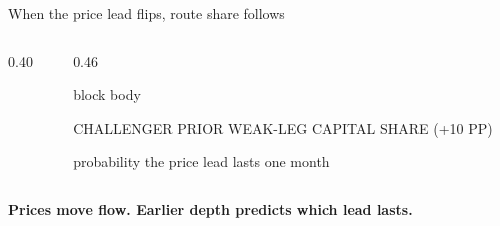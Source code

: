\begin{frame}[label=crossing]{When the price lead flips, route share follows}
\begin{columns}[T,totalwidth=0.91\textwidth]
\begin{column}{0.40\textwidth}
\end{column}
\hfill
\begin{column}{0.46\textwidth}
\begin{beamercolorbox}[rounded=true,sep=0.14cm,wd=\textwidth]{block body}
{\scriptsize\color{muted} CHALLENGER PRIOR WEAK-LEG CAPITAL SHARE (+10 PP)\par}\vspace{0.04cm}
{\fontsize{23}{25}\selectfont\bfseries\color{stable}\RankCrossingCapitalPersistence\par}
{\small probability the price lead lasts one month}
\end{beamercolorbox}
\end{column}
\end{columns}
\vspace{0.10cm}
{\normalsize\bfseries\color{ucldark}\centering Prices move flow. Earlier depth predicts which lead lasts.\par}
\end{frame}

